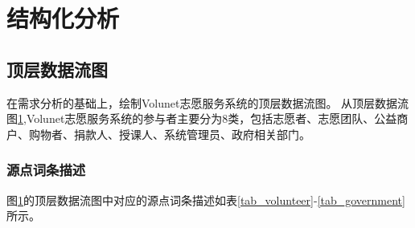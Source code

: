 \section{结构化分析}

\subsection{顶层数据流图}

在需求分析的基础上，绘制Volunet志愿服务系统的顶层数据流图。
从顶层数据流图\ref{top_data},Volunet志愿服务系统的参与者主要分为8类，包括志愿者、志愿团队、公益商户、购物者、捐款人、授课人、系统管理员、政府相关部门。

\begin{figure}[H] 
    \label{top_data}
    \end{figure}

\subsubsection{源点词条描述}

图\ref{top_data}的顶层数据流图中对应的源点词条描述如表\ref{tab_volunteer}-\ref{tab_government}所示。

